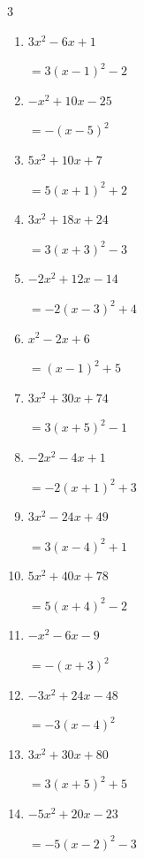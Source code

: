 \begin{multicols}{3}
\begin{enumerate}
  \item $3x^{2}-6x+1$

        $=3\left( x-1\right)^{2}-2$

  \item $-x^{2}+10x-25$

        $=-\left( x-5\right)^{2}$

  \item $5x^{2}+10x+7$

        $=5\left( x+1\right)^{2}+2$

  \item $3x^{2}+18x+24$

        $=3\left( x+3\right)^{2}-3$

  \item $-2x^{2}+12x-14$

        $=-2\left( x-3\right)^{2}+4$

  \item $x^{2}-2x+6$

        $=\left( x-1\right)^{2}+5$

  \item $3x^{2}+30x+74$

        $=3\left( x+5\right)^{2}-1$

\columnbreak %

\resetques

  \item $-2x^{2}-4x+1$

        $=-2\left( x+1\right)^{2}+3$

  \item $3x^{2}-24x+49$

        $=3\left( x-4\right)^{2}+1$

  \item $5x^{2}+40x+78$

        $=5\left( x+4\right)^{2}-2$

  \item $-x^{2}-6x-9$

        $=-\left( x+3\right)^{2}$

  \item $-3x^{2}+24x-48$

        $=-3\left( x-4\right)^{2}$

  \item $3x^{2}+30x+80$

        $=3\left( x+5\right)^{2}+5$

  \item $-5x^{2}+20x-23$

        $=-5\left( x-2\right)^{2}-3$


\end{enumerate}
\end{multicols}
